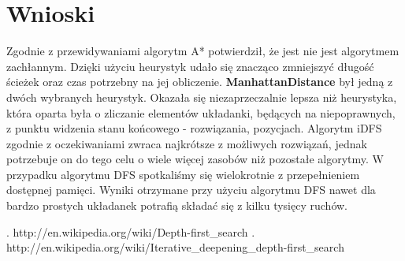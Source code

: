 \documentclass{classrep}
\begin{document}
\begin{center}
				    
				    
				    \end{center}
			
	\section{Wnioski}
		Zgodnie z przewidywaniami algorytm A* potwierdził, że jest nie jest algorytmem zachłannym. Dzięki użyciu
		heurystyk udało się znacząco zmniejszyć długość ścieżek oraz czas potrzebny na jej obliczenie. 
		\textbf{ManhattanDistance} był jedną z dwóch wybranych heurystyk. Okazała się niezaprzeczalnie lepsza
		niż heurystyka, która oparta była o zliczanie elementów układanki, będących na niepoprawnych, z punktu
		widzenia stanu końcowego - rozwiązania, pozycjach.
		Algorytm iDFS zgodnie z oczekiwaniami zwraca najkrótsze z możliwych rozwiązań, jednak potrzebuje on do tego celu o wiele więcej zasobów niż pozostałe algorytmy. W przypadku algorytmu DFS spotkaliśmy się wielokrotnie z przepełnieniem dostępnej pamięci. Wyniki otrzymane przy użyciu algorytmu DFS nawet dla bardzo prostych układanek potrafią składać się z kilku tysięcy ruchów.   
	
	\begin{thebibliography}{0}
	  \bibitem. http://en.wikipedia.org/wiki/Depth-first\_search
	  \bibitem. http://en.wikipedia.org/wiki/Iterative\_deepening\_depth-first\_search   
	\end{thebibliography}
\end{document}
